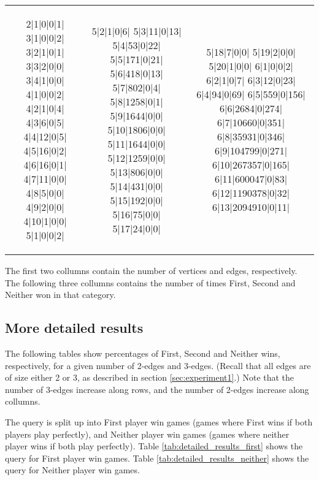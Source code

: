 \begin{tabular}{c | c | c}
\begin{minipage}{1.0in}
\begin{datalisting}
2|1|0|0|1|
3|1|0|0|2|
3|2|1|0|1|
3|3|2|0|0|
3|4|1|0|0|
4|1|0|0|2|
4|2|1|0|4|
4|3|6|0|5|
4|4|12|0|5|
4|5|16|0|2|
4|6|16|0|1|
4|7|11|0|0|
4|8|5|0|0|
4|9|2|0|0|
4|10|1|0|0|
5|1|0|0|2|
\end{datalisting}
\end{minipage}
&
\begin{minipage}{1.0in}
\begin{datalisting}
5|2|1|0|6|
5|3|11|0|13|
5|4|53|0|22|
5|5|171|0|21|
5|6|418|0|13|
5|7|802|0|4|
5|8|1258|0|1|
5|9|1644|0|0|
5|10|1806|0|0|
5|11|1644|0|0|
5|12|1259|0|0|
5|13|806|0|0|
5|14|431|0|0|
5|15|192|0|0|
5|16|75|0|0|
5|17|24|0|0|
\end{datalisting}
\end{minipage}
&
\begin{minipage}{1.0in}
\begin{datalisting}
5|18|7|0|0|
5|19|2|0|0|
5|20|1|0|0|
6|1|0|0|2|
6|2|1|0|7|
6|3|12|0|23|
6|4|94|0|69|
6|5|559|0|156|
6|6|2684|0|274|
6|7|10660|0|351|
6|8|35931|0|346|
6|9|104799|0|271|
6|10|267357|0|165|
6|11|600047|0|83|
6|12|1190378|0|32|
6|13|2094910|0|11|
\end{datalisting}
\end{minipage}
\\
\end{tabular}

The first two collumns contain the number of vertices and edges, respectively. The following three collumns contains the number of times First, Second and Neither won in that category.

\subsection{More detailed results}

The following tables show percentages of First, Second and Neither wins, respectively, for a given number of 2-edges and 3-edges.
(Recall that all edges are of size either 2 or 3, as described in section \ref{sec:experiment1}.)
Note that the number of 3-edges increase along rows, and the number of 2-edges increase along collumns.

The query is split up into First player win games (games where First wins if both players play perfectly), and Neither player win games (games where neither player wins if both play perfectly).
Table \ref{tab:detailed_results_first} shows the query for First player win games. Table \ref{tab:detailed_results_neither} shows the query for Neither player win games.

